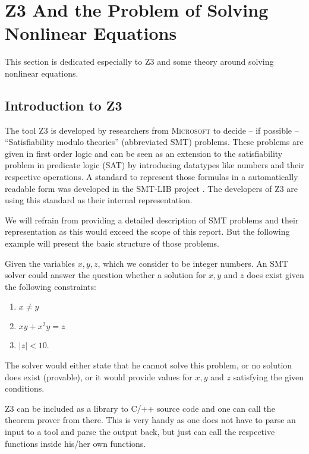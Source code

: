 \documentclass[oribibl]{llncs}
\begin{document}
\section{\textsc{Z3} And the Problem of Solving Nonlinear Equations}
\label{sctn:Z3}

This section is dedicated especially to \textsc{Z3} and some theory
around solving nonlinear equations.

\subsection{Introduction to Z3}
The tool \textsc{Z3} \cite{de2008z3}  is developed by researchers from \textsc{Microsoft} to decide -- if
possible -- ``Satisfiability modulo theories'' (abbreviated SMT)
problems. These problems are given in first order logic and can be
seen as an extension to the satisfiability problem in predicate logic
(SAT) by introducing datatypes like numbers and their respective
operations. A standard to represent those formulas in a automatically
readable form was developed in the \textsc{SMT-LIB} project  \cite{barrett2010smt}.
The developers of \textsc{Z3} are using this standard as their
internal representation.

We will refrain from providing a detailed description of SMT problems
and their representation as this would exceed the scope of this
report. But the following example will present the basic structure of
those problems.

\begin{example}
  Given the variables $x,y,z$, which we consider to
  be integer numbers. An SMT solver could answer the question whether
  a solution for $x,y$ and $z$ does exist given the following
  constraints:
  \begin{enumerate}
    \item $x \neq y$
    \item $xy+x^2y=z$
    \item $|z|<10$.
  \end{enumerate}
  The solver would either state that he cannot solve this problem, or
  no solution does exist (provable), or it would provide values for
  $x,y$ and $z$ satisfying the given conditions.
\end{example}

\textsc{Z3} can be included as a library to C/++ source code and one
can call the theorem prover from there. This is very handy as one does
not have to parse an input to a tool and parse the output back, but
just can call the respective functions inside his/her own functions.
\end{document}
